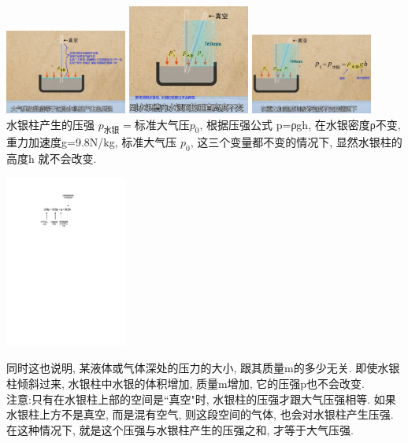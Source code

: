 \documentclass[UTF8]{ctexart}
\begin{document}
	\includegraphics[width=0.3\textwidth]{img/0026.png}	
	\includegraphics[width=0.3\textwidth]{img/0028.png}
	\includegraphics[width=0.3\textwidth]{img/0029.png} \\
	
	水银柱产生的压强 $p_{\text{水银}}=\text{标准大气压}p_0$, 根据压强公式 p=ρgh, 在水银密度ρ不变, 重力加速度g=9.8N/kg, 标准大气压 $p_0$,  这三个变量都不变的情况下, 显然水银柱的高度h 就不会改变.
	
	\includegraphics[width=0.3\textwidth]{img/0031.pdf} 
	
	同时这也说明, 某液体或气体深处的压力的大小, 跟其质量m的多少无关. 即使水银柱倾斜过来, 水银柱中水银的体积增加, 质量m增加, 它的压强p也不会改变. \\
	
	注意:只有在水银柱上部的空间是``真空"时, 水银柱的压强才跟大气压强相等. 如果水银柱上方不是真空, 而是混有空气, 则这段空间的气体, 也会对水银柱产生压强. 在这种情况下, 就是这个压强与水银柱产生的压强之和, 才等于大气压强.
	
\end{document}
